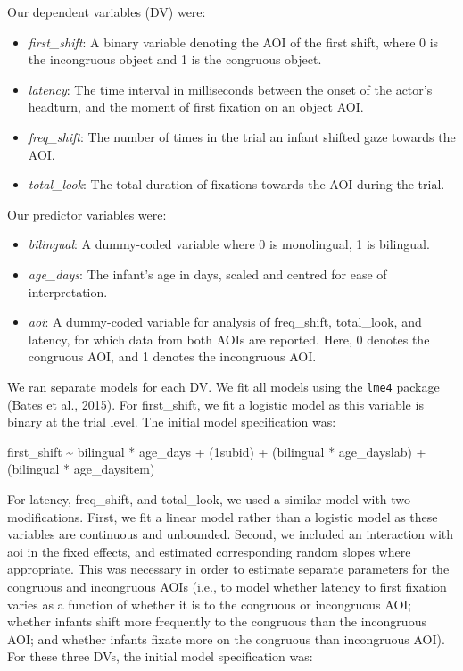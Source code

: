 \documentclass[,man,floatsintext]{apa6}
\begin{document}
Our dependent variables (DV) were:

\begin{itemize}
\item
  \emph{first\_shift}: A binary variable denoting the AOI of the first shift, where 0 is the incongruous object and 1 is the congruous object.
\item
  \emph{latency}: The time interval in milliseconds between the onset of the actor's headturn, and the moment of first fixation on an object AOI.
\item
  \emph{freq\_shift}: The number of times in the trial an infant shifted gaze towards the AOI.
\item
  \emph{total\_look}: The total duration of fixations towards the AOI during the trial.
\end{itemize}

Our predictor variables were:

\begin{itemize}
\item
  \emph{bilingual}: A dummy-coded variable where 0 is monolingual, 1 is bilingual.
\item
  \emph{age\_days}: The infant's age in days, scaled and centred for ease of interpretation.
\item
  \emph{aoi}: A dummy-coded variable for analysis of freq\_shift, total\_look, and latency, for which data from both AOIs are reported. Here, 0 denotes the congruous AOI, and 1 denotes the incongruous AOI.
\end{itemize}

We ran separate models for each DV. We fit all models using the \texttt{lme4} package (Bates et al., 2015). For first\_shift, we fit a logistic model as this variable is binary at the trial level. The initial model specification was:

first\_shift \textasciitilde{} bilingual * age\_days +
(1\textbar{}subid) +
(bilingual * age\_days\textbar{}lab) +
(bilingual * age\_days\textbar{}item)

For latency, freq\_shift, and total\_look, we used a similar model with two modifications. First, we fit a linear model rather than a logistic model as these variables are continuous and unbounded. Second, we included an interaction with aoi in the fixed effects, and estimated corresponding random slopes where appropriate. This was necessary in order to estimate separate parameters for the congruous and incongruous AOIs (i.e., to model whether latency to first fixation varies as a function of whether it is to the congruous or incongruous AOI; whether infants shift more frequently to the congruous than the incongruous AOI; and whether infants fixate more on the congruous than incongruous AOI). For these three DVs, the initial model specification was:
\end{document}
